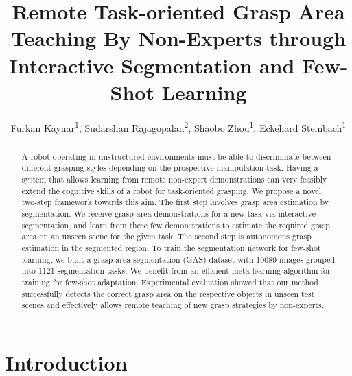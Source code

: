 \documentclass[letterpaper]{article} %
\title{Remote Task-oriented Grasp Area Teaching By Non-Experts through Interactive Segmentation and Few-Shot Learning}
\author {Furkan Kaynar\textsuperscript{\rm 1}\equalcontrib, Sudarshan Rajagopalan\textsuperscript{\rm 2}\equalcontrib, 
Shaobo Zhou\textsuperscript{\rm 1}, 
Eckehard Steinbach\textsuperscript{\rm 1}}
\begin{document}
%
\maketitle
%
\begin{abstract}

A robot operating in unstructured environments must be able to discriminate between different grasping styles depending on the prospective manipulation task. Having a system that allows learning from remote non-expert demonstrations can very feasibly extend the cognitive skills of a robot for task-oriented grasping. We propose a novel two-step framework towards this aim. The first step involves grasp area estimation by segmentation. We receive grasp area demonstrations for a new task via interactive segmentation, and learn from these few demonstrations to estimate the required grasp area on an unseen scene for the given task. The second step is autonomous grasp estimation in the segmented region. To train the segmentation network for few-shot learning, we built a grasp area segmentation (GAS) dataset with 10089 images grouped into 1121 segmentation tasks. We benefit from an efficient meta learning algorithm for training for few-shot adaptation. Experimental evaluation showed that our method successfully detects the correct grasp area on the respective objects in unseen test scenes and effectively allows remote teaching of new grasp strategies by non-experts.

\end{abstract}
%

\section{Introduction}
\label{sec:intro}
\end{document}
